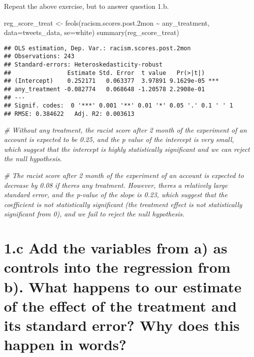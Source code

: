 \documentclass[
]{article}
\newenvironment{Shaded}{\begin{snugshade}}{\end{snugshade}}
\newcommand{\AttributeTok}[1]{\textcolor[rgb]{0.77,0.63,0.00}{#1}}
\newcommand{\CommentTok}[1]{\textcolor[rgb]{0.56,0.35,0.01}{\textit{#1}}}
\newcommand{\FloatTok}[1]{\textcolor[rgb]{0.00,0.00,0.81}{#1}}
\newcommand{\FunctionTok}[1]{\textcolor[rgb]{0.00,0.00,0.00}{#1}}
\newcommand{\NormalTok}[1]{#1}
\newcommand{\OtherTok}[1]{\textcolor[rgb]{0.56,0.35,0.01}{#1}}
\newcommand{\SpecialCharTok}[1]{\textcolor[rgb]{0.00,0.00,0.00}{#1}}
\newcommand{\StringTok}[1]{\textcolor[rgb]{0.31,0.60,0.02}{#1}}
\begin{document}
Repeat the above exercise, but to answer question 1.b.

\begin{Shaded}
\begin{Highlighting}[]
\NormalTok{reg\_score\_treat }\OtherTok{\textless{}{-}} \FunctionTok{feols}\NormalTok{(racism.scores.post}\FloatTok{.2}\NormalTok{mon }\SpecialCharTok{\textasciitilde{}}\NormalTok{ any\_treatment, }\AttributeTok{data=}\NormalTok{tweets\_data, }\AttributeTok{se=}\StringTok{\textquotesingle{}white\textquotesingle{}}\NormalTok{)}
\FunctionTok{summary}\NormalTok{(reg\_score\_treat)}
\end{Highlighting}
\end{Shaded}

\begin{verbatim}
## OLS estimation, Dep. Var.: racism.scores.post.2mon
## Observations: 243 
## Standard-errors: Heteroskedasticity-robust 
##                Estimate Std. Error  t value   Pr(>|t|)    
## (Intercept)    0.252171   0.063377  3.97891 9.1629e-05 ***
## any_treatment -0.082774   0.068648 -1.20578 2.2908e-01    
## ---
## Signif. codes:  0 '***' 0.001 '**' 0.01 '*' 0.05 '.' 0.1 ' ' 1
## RMSE: 0.384622   Adj. R2: 0.003613
\end{verbatim}

\begin{Shaded}
\begin{Highlighting}[]
\CommentTok{\# Without any treatment, the racist score after 2 month of the experiment of an account is expected to be 0.25, and the p value of the intercept is very small, which suggest that the intercept is highly statistically significant and we can reject the null hypothesis.}

\CommentTok{\# The racist score after 2 month of the experiment of an account is expected to decrease by 0.08 if there\textquotesingle{}s any treatment. However, there\textquotesingle{}s a relatively large standard error, and the p{-}value of the slope is 0.23, which suggest that the coefficient is not statistically significant (the treatment effect is not statistically significant from 0), and we fail to reject the null hypothesis. }
\end{Highlighting}
\end{Shaded}

\hypertarget{c-add-the-variables-from-a-as-controls-into-the-regression-from-b.-what-happens-to-our-estimate-of-the-effect-of-the-treatment-and-its-standard-error-why-does-this-happen-in-words}{%
\section{1.c Add the variables from a) as controls into the regression
from b). What happens to our estimate of the effect of the treatment and
its standard error? Why does this happen in
words?}\label{c-add-the-variables-from-a-as-controls-into-the-regression-from-b.-what-happens-to-our-estimate-of-the-effect-of-the-treatment-and-its-standard-error-why-does-this-happen-in-words}}
\end{document}
